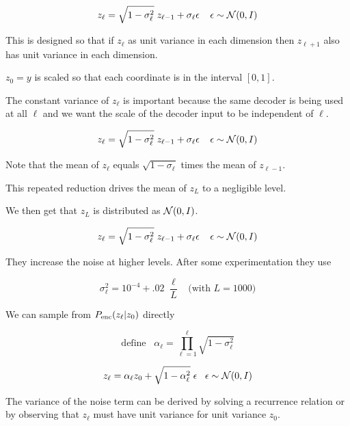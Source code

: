 {

$$z_\ell = \sqrt{1-\sigma^2_\ell}\;z_{\ell-1} + \sigma_\ell \epsilon\;\;\;\;\epsilon \sim {\cal N}(0,I)$$

\vfill
This is designed so that if $z_\ell$ as unit variance in each dimension then $z_{\ell+1}$ also has unit variance in each dimension.

\vfill
$z_0 = y$ is scaled so that each coordinate is in the interval $[0,1]$.

\vfill
The constant variance of $z_\ell$ is important because the same decoder is being used at all $\ell$ and we want
the scale of the decoder input to be independent of $\ell$.


$$z_\ell = \sqrt{1-\sigma^2_\ell}\;z_{\ell-1} + \sigma_\ell \epsilon\;\;\;\;\epsilon \sim {\cal N}(0,I)$$

\vfill
Note that the mean of $z_\ell$ equals $\sqrt{1-\sigma_\ell}$ times the mean of $z_{\ell-1}$.

\vfill
This repeated reduction drives the mean of $z_L$ to a negligible level.

\vfill
We then get that $z_L$ is distributed as ${\cal N}(0,I)$.


$$z_\ell = \sqrt{1-\sigma^2_\ell}\;z_{\ell-1} + \sigma_\ell \epsilon\;\;\;\;\epsilon \sim {\cal N}(0,I)$$

\vfill
They increase the noise at higher levels.  After some experimentation they use

$$\sigma^2_\ell = 10^{-4} + .02\;\frac{\ell}{L}\;\;\;(\mbox{with $L = 1000$)}$$




We can sample from $P_{\mathrm{enc}}(z_\ell|z_0)$ directly

$$\mbox{define}\;\;\;\alpha_\ell = \prod_{\ell = 1}^\ell \sqrt{1-\sigma^2_\ell}$$

\vfill

$$z_\ell = \alpha_\ell z_0 + \sqrt{1-\alpha^2_\ell} \;\epsilon\;\;\;\epsilon \sim {\cal N}(0,I)$$

\vfill
The variance of the noise term can be derived by solving a recurrence relation or by observing that $z_\ell$ must have unit variance for unit variance $z_0$.


}
